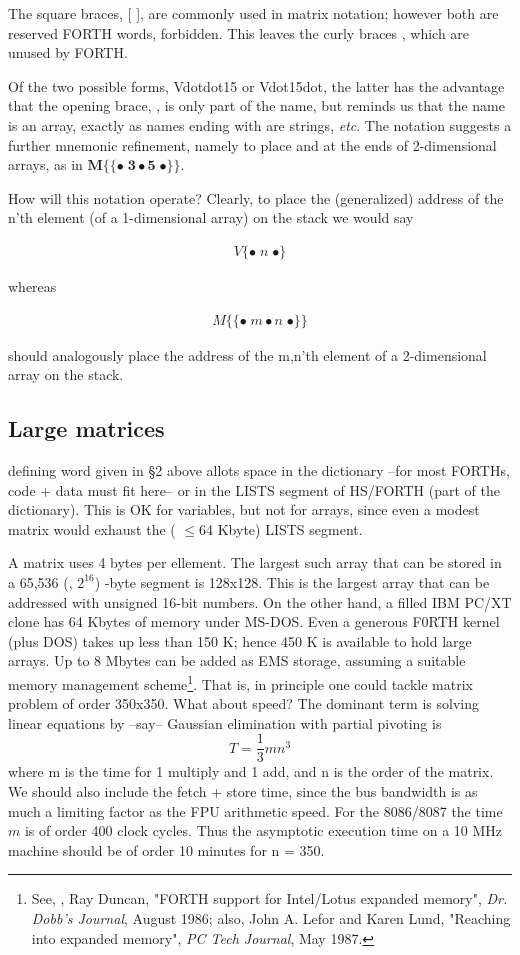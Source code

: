 The square braces, [ ], are commonly used in matrix notation; however both are reserved FORTH words, \ie forbidden. This leaves the curly braces { }, which are unused by FORTH.

Of the two possible forms, Vdot{dot15} or V{dot15dot}, the latter has the
advantage that the opening brace, \regc{\{}, is only part of the name, but
reminds us that the name  is an array, exactly as names ending with
\bc{\$} are strings, \textit{etc}. The notation suggests a further mnemonic
refinement, namely to place \bc{\{\{} and \bc{\}\}} at the ends of
2-dimensional arrays, as in $\mathbf{M\{\{\bullet \;3 \bullet 5 \;\bullet \}\}}$.

How will this notation operate? Clearly, to place the (generalized) address of the n'th element (of a 1-dimensional array) on the stack we would say

\begin{align*}
    V\{\bullet \;n \;\bullet\}
\end{align*}

whereas

\begin{align*}
    M\{\{ \bullet \;m \bullet n \;\bullet\}\}
\end{align*}

should analogously place the address of the m,n'th element of a 2-dimensional array on the stack.

\subsection{Large matrices}
 defining word  given in \S2 above allots space in the dictionary --for most FORTHs, code + data must fit here-- or in the LISTS segment of HS/FORTH (part of the dictionary). This is OK for variables, but not for arrays, since even a modest matrix would exhaust the ( $\leq$64 Kbyte) LISTS segment.

A  matrix uses 4 bytes per ellement. The largest such array that can be stored in a 65,536 (\ie, $2^{16}$) -byte segment is 128x128. This is the largest array that can be addressed with unsigned 16-bit numbers. On the other hand, a filled IBM PC/XT clone has 64 Kbytes of memory under MS-DOS. Even a generous F0RTH kernel (plus DOS) takes up less than 150 K; hence 450 K is available to hold large arrays. Up to 8 Mbytes can be added as EMS storage, assuming a suitable memory management scheme\footnote{See, \eg, Ray Duncan, "FORTH support for Intel/Lotus expanded memory", \textit{Dr. Dobb's Journal}, August 1986; also, John A. Lefor and Karen Lund, "Reaching into expanded memory", \textit{PC Tech Journal}, May 1987.}. That is, in principle one could tackle matrix problem of order 350x350. What about speed? The dominant term is solving linear equations by --say-- Gaussian elimination with partial pivoting is
\[
T = \frac{1}{3} mn^{3}
\]
where m is the time for 1 multiply and 1 add, and n is the order of the matrix. We should also include the fetch + store time, since the bus bandwidth is as much a limiting factor as the FPU arithmetic speed. For the 8086/8087 the time $m$ is of order 400 clock cycles. Thus the asymptotic execution time on a 10 MHz machine should be of order 10 minutes for n = 350.

